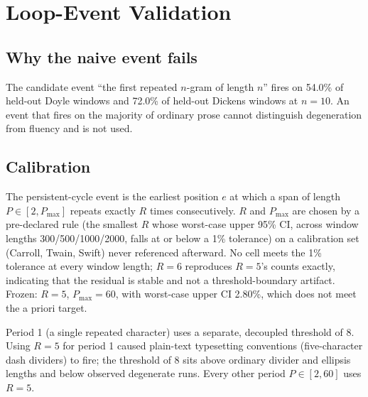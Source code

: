 \section{Loop-Event Validation}
\label{sec:event}

\subsection{Why the naive event fails}
\label{ssec:naive-fails}
The candidate event ``the first repeated $n$-gram of length $n$'' fires on 54.0\% of held-out Doyle windows and 72.0\% of held-out Dickens windows at $n{=}10$. An event that fires on the majority of ordinary prose cannot distinguish degeneration from fluency and is not used.

\subsection{Calibration}
The persistent-cycle event is the earliest position $e$ at which a span of length $P\in[2,P_{\max}]$ repeats exactly $R$ times consecutively. $R$ and $P_{\max}$ are chosen by a pre-declared rule (the smallest $R$ whose worst-case upper 95\% CI, across window lengths 300/500/1000/2000, falls at or below a 1\% tolerance) on a calibration set (Carroll, Twain, Swift) never referenced afterward. No cell meets the 1\% tolerance at every window length; $R{=}6$ reproduces $R{=}5$'s counts exactly, indicating that the residual is stable and not a threshold-boundary artifact. Frozen: $R{=}5$, $P_{\max}{=}60$, with worst-case upper CI 2.80\%, which does not meet the a priori target.

Period 1 (a single repeated character) uses a separate, decoupled threshold of 8. Using $R{=}5$ for period 1 caused plain-text typesetting conventions (five-character dash dividers) to fire; the threshold of 8 sits above ordinary divider and ellipsis lengths and below observed degenerate runs. Every other period $P\in[2,60]$ uses $R{=}5$.


